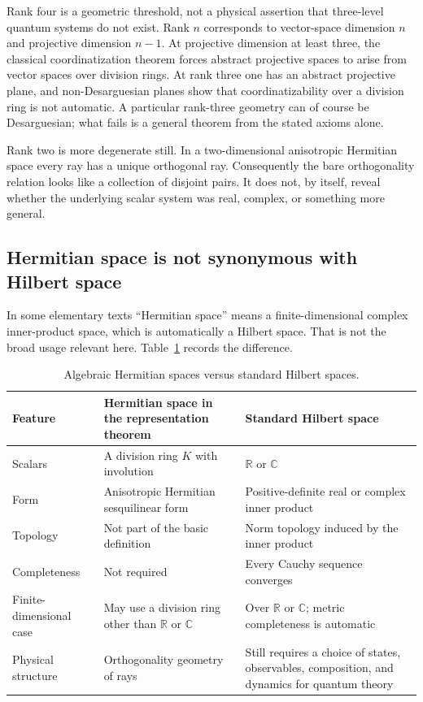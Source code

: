 \documentclass[
  aps,
  pra,
  twocolumn,
  amsmath,
  amssymb,
  longbibliography,
  nofootinbib,
  floatfix
]{revtex4-2}
\begin{document}
Rank four is a geometric threshold, not a physical assertion that three-level
quantum systems do not exist.  Rank $n$ corresponds to vector-space dimension
$n$ and projective dimension $n-1$.  At projective dimension at least three,
the classical coordinatization theorem forces abstract projective spaces to
arise from vector spaces over division rings.  At rank three one has an
abstract projective plane, and non-Desarguesian planes show that
coordinatizability over a division ring is not automatic.  A particular
rank-three geometry can of course be Desarguesian; what fails is a general
theorem from the stated axioms alone.

Rank two is more degenerate still.  In a two-dimensional anisotropic Hermitian
space every ray has a unique orthogonal ray.  Consequently the bare
orthogonality relation looks like a collection of disjoint pairs.  It does not,
by itself, reveal whether the underlying scalar system was real, complex, or
something more general.

\subsection{Hermitian space is not synonymous with Hilbert space}
\label{sec:hermitian-hilbert}

In some elementary texts ``Hermitian space'' means a finite-dimensional complex
inner-product space, which is automatically a Hilbert space.  That is not the
broad usage relevant here.  Table~\ref{tab:hermitian-hilbert} records the
difference.

\begin{table}
\caption{Algebraic Hermitian spaces versus standard Hilbert spaces.}
\label{tab:hermitian-hilbert}
\begin{tabular}{p{}p{}p{}}
\toprule
Feature & Hermitian space in the representation theorem & Standard Hilbert space\\
\midrule
Scalars & A division ring $K$ with involution & $\mathbb R$ or $\mathbb C$\\
Form & Anisotropic Hermitian sesquilinear form & Positive-definite real or complex inner product\\
Topology & Not part of the basic definition & Norm topology induced by the inner product\\
Completeness & Not required & Every Cauchy sequence converges\\
Finite-dimensional case & May use a division ring other than $\mathbb R$ or $\mathbb C$ & Over $\mathbb R$ or $\mathbb C$; metric completeness is automatic\\
Physical structure & Orthogonality geometry of rays & Still requires a choice of states, observables, composition, and dynamics for quantum theory
\\\bottomrule
\end{tabular}
\end{table}
\end{document}
